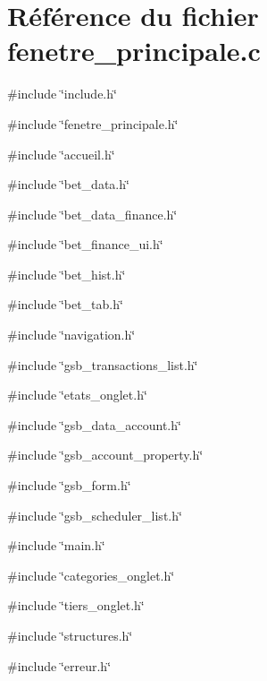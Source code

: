 \section{Référence du fichier fenetre\_\-principale.c}
\label{fenetre__principale_8c}
{\ttfamily \#include \char`\"{}include.h\char`\"{}}\par
{\ttfamily \#include \char`\"{}fenetre\_\-principale.h\char`\"{}}\par
{\ttfamily \#include \char`\"{}accueil.h\char`\"{}}\par
{\ttfamily \#include \char`\"{}bet\_\-data.h\char`\"{}}\par
{\ttfamily \#include \char`\"{}bet\_\-data\_\-finance.h\char`\"{}}\par
{\ttfamily \#include \char`\"{}bet\_\-finance\_\-ui.h\char`\"{}}\par
{\ttfamily \#include \char`\"{}bet\_\-hist.h\char`\"{}}\par
{\ttfamily \#include \char`\"{}bet\_\-tab.h\char`\"{}}\par
{\ttfamily \#include \char`\"{}navigation.h\char`\"{}}\par
{\ttfamily \#include \char`\"{}gsb\_\-transactions\_\-list.h\char`\"{}}\par
{\ttfamily \#include \char`\"{}etats\_\-onglet.h\char`\"{}}\par
{\ttfamily \#include \char`\"{}gsb\_\-data\_\-account.h\char`\"{}}\par
{\ttfamily \#include \char`\"{}gsb\_\-account\_\-property.h\char`\"{}}\par
{\ttfamily \#include \char`\"{}gsb\_\-form.h\char`\"{}}\par
{\ttfamily \#include \char`\"{}gsb\_\-scheduler\_\-list.h\char`\"{}}\par
{\ttfamily \#include \char`\"{}main.h\char`\"{}}\par
{\ttfamily \#include \char`\"{}categories\_\-onglet.h\char`\"{}}\par
{\ttfamily \#include \char`\"{}tiers\_\-onglet.h\char`\"{}}\par
{\ttfamily \#include \char`\"{}structures.h\char`\"{}}\par
{\ttfamily \#include \char`\"{}erreur.h\char`\"{}}\par
